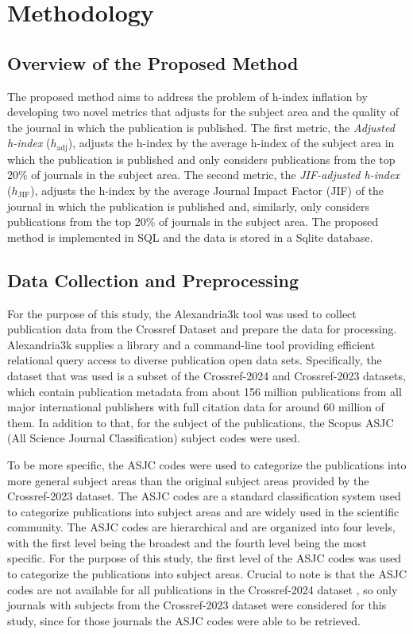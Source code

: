\chapter{Methodology}
\label{ch:methods}

\section{Overview of the Proposed Method}

The proposed method aims to address the problem of h-index inflation by
developing two novel metrics that adjusts for the subject area and the quality
of the journal in which the publication is published. The first metric, the
\textit{Adjusted h-index} ($h_{\text{adj}}$), adjusts the h-index by the
average h-index of the subject area in which the publication is published and
only considers publications from the top 20\% of journals in the subject area.
The second metric, the \textit{JIF-adjusted h-index} ($h_{\text{JIF}}$),
adjusts the h-index by the average Journal Impact Factor (JIF) of the journal
in which the publication is published and, similarly, only considers
publications from the top 20\% of journals in the subject area. The proposed
method is implemented in SQL and the data is stored in a Sqlite database.

\section{Data Collection and Preprocessing}

For the purpose of this study, the Alexandria3k \cite{Spi23g} tool was used to
collect publication data from the Crossref Dataset \cite{Crossref2020} and
prepare the data for processing. Alexandria3k supplies a library and a
command-line tool providing efficient relational query access to diverse
publication open data sets. Specifically, the dataset that was used is a subset
of the Crossref-2024 and Crossref-2023 datasets, which contain publication
metadata from about 156 million publications from all major international
publishers with full citation data for around 60 million of them. In addition
to that, for the subject of the publications, the Scopus ASJC (All Science
Journal Classification) subject codes were used.

To be more specific, the ASJC codes were used to categorize the publications
into more general subject areas than the original subject areas provided by the
Crossref-2023 dataset. The ASJC codes are a standard classification system used
to categorize publications into subject areas and are widely used in the
scientific community. The ASJC codes are hierarchical and are organized into
four levels, with the first level being the broadest and the fourth level being
the most specific. For the purpose of this study, the first level of the ASJC
codes was used to categorize the publications into subject areas. Crucial to
note is that the ASJC codes are not available for all publications in the
Crossref-2024 dataset \cite{crossrefSubjectCodes2024}, so only journals with
subjects from the Crossref-2023 dataset were considered for this study, since
for those journals the ASJC codes were able to be retrieved.

